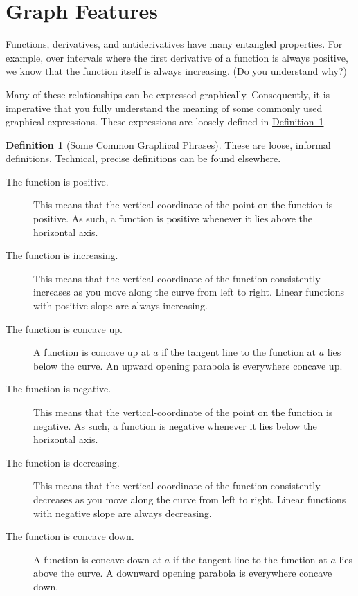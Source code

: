 \documentclass[12pt,]{book}
\theoremstyle{plain}
\theoremstyle{definition}
\newtheorem{definition}[theorem]{Definition}
\numberwithin{equation}{section}
\begin{document}
\section[Graph Features]{Graph Features}\label{section-graph-features}
Functions, derivatives, and antiderivatives have many entangled properties. For example, over intervals where the first derivative of a function is always positive, we know that the function itself is always increasing. (Do you understand why?)%
\par
Many of these relationships can be expressed graphically. Consequently, it is imperative that you fully understand the meaning of some commonly used graphical expressions. These expressions are loosely defined in \hyperref[definition-graph-features]{Definition~\ref*{definition-graph-features}}.%
\begin{definition}[Some Common Graphical Phrases]\label{definition-graph-features}
These are loose, informal definitions. Technical, precise definitions can be found elsewhere.%
\begin{multicols}{2}
\begin{description}
\item[The function is positive.]{}This means that the vertical-coordinate of the point on the function is positive. As such, a function is positive whenever it lies above the horizontal axis.\item[The function is increasing.]{}This means that the vertical-coordinate of the function consistently increases as you move along the curve from left to right. Linear functions with positive slope are always increasing.\item[The function is concave up.]{}A function is concave up at \(a\) if the tangent line to the function at \(a\) lies below the curve. An upward opening parabola is everywhere concave up.\item[The function is negative.]{}This means that the vertical-coordinate of the point on the function is negative. As such, a function is negative whenever it lies below the horizontal axis.\item[The function is decreasing.]{}This means that the vertical-coordinate of the function consistently decreases as you move along the curve from left to right. Linear functions with negative slope are always decreasing.\item[The function is concave down.]{}A function is concave down at \(a\) if the tangent line to the function at \(a\) lies above the curve. A downward opening parabola is everywhere concave down.\end{description}
\end{multicols}
\end{definition}
\typeout{************************************************}
\typeout{************************************************}
\end{document}
